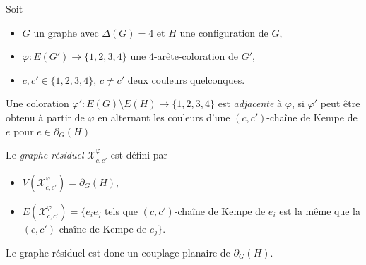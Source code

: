 \documentclass{beamer}
\begin{document}
\begin{frame}
Soit 
\begin{itemize}
\item $G$ un graphe avec $\Delta(G)=4$ et $H$ une configuration de $G$,
\item $\varphi:E(G')\to \{1,2,3,4\}$ une 4-arête-coloration de $G'$,
\item $c, c' \in \{1,2,3,4\}$, $c\ne c'$ deux couleurs quelconques. 
\end{itemize}

Une coloration $\varphi':E(G)\setminus E(H)\to \{1,2,3,4\}$ est \emph{adjacente} à $\varphi$, si $\varphi'$ peut être obtenu à partir de $\varphi$ en alternant les couleurs d'une $(c,c')$-chaîne de Kempe de $e$ pour $e\in\partial_G(H)$



\end{frame}
%
\begin{frame}
%
%

Le \emph{graphe résiduel}
$\mathcal{X}^{\varphi}_{c,c'}$ est défini par
\begin{itemize}
\item $V(\mathcal{X}^{\varphi}_{c,c'}) = \partial_G(H)$, 
\item $E(\mathcal{X}^{\varphi}_{c,c'}) = \{ e_ie_j$ tels que $(c,c')$-chaîne de Kempe de $e_i$ est la même que la $(c,c')$-chaîne de Kempe de $e_j\}$.
\end{itemize}


Le graphe résiduel est donc un couplage planaire de $\partial_G(H)$.
\end{frame}
\end{document}
